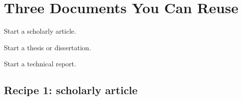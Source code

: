\chapter{Three Documents You Can Reuse}
\label{chap:recipes}

\begin{learningoutcomes}
  \item Start a scholarly article.
  \item Start a thesis or dissertation.
  \item Start a technical report.
\end{learningoutcomes}

\section{Recipe 1: scholarly article}

